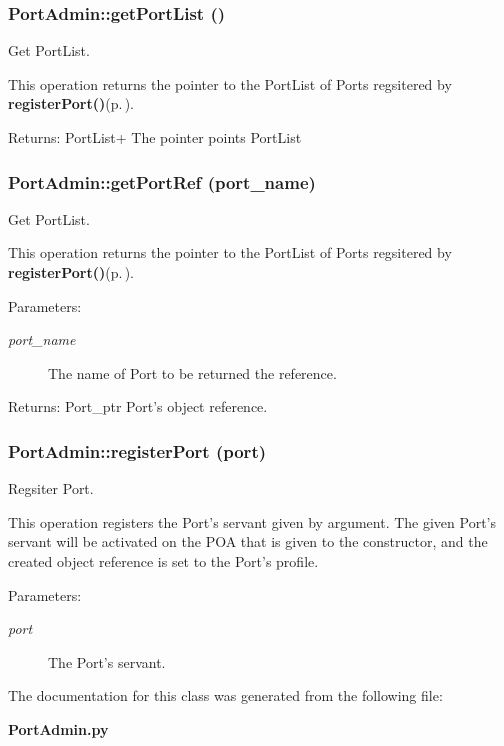 \subsubsection{\setlength{\rightskip}{0pt plus 5cm}Port\-Admin::get\-Port\-List ()}\label{classPortAdmin_PortAdmina7}


Get Port\-List. 

This operation returns the pointer to the Port\-List of Ports regsitered by {\bf register\-Port()}{\rm (p.\,\pageref{classPortAdmin_PortAdmina10})}. \begin{Desc}
\item[Returns:]Port\-List+ The pointer points Port\-List\end{Desc}
\subsubsection{\setlength{\rightskip}{0pt plus 5cm}Port\-Admin::get\-Port\-Ref (port\_\-name)}\label{classPortAdmin_PortAdmina8}


Get Port\-List. 

This operation returns the pointer to the Port\-List of Ports regsitered by {\bf register\-Port()}{\rm (p.\,\pageref{classPortAdmin_PortAdmina10})}. \begin{Desc}
\item[Parameters:]
\begin{description}
\item[{\em port\_\-name}]The name of Port to be returned the reference. \end{description}
\end{Desc}
\begin{Desc}
\item[Returns:]Port\_\-ptr Port's object reference.\end{Desc}
\subsubsection{\setlength{\rightskip}{0pt plus 5cm}Port\-Admin::register\-Port (port)}\label{classPortAdmin_PortAdmina10}


Regsiter Port. 

This operation registers the Port's servant given by argument. The given Port's servant will be activated on the POA that is given to the constructor, and the created object reference is set to the Port's profile. \begin{Desc}
\item[Parameters:]
\begin{description}
\item[{\em port}]The Port's servant.\end{description}
\end{Desc}


The documentation for this class was generated from the following file:\begin{CompactItemize}
\item 
{\bf Port\-Admin.py}\end{CompactItemize}
